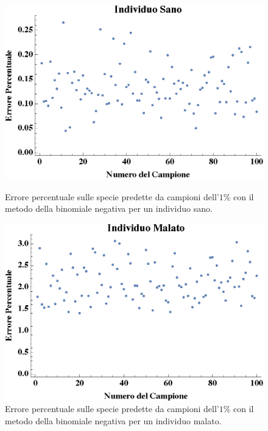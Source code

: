\begin{figure}[h]
  \centering
  \begin{minipage}[b]{0.4\textwidth}
    \includegraphics[width=\textwidth]{Figure/erroriHtets.eps}
    \caption{Errore percentuale sulle specie predette da campioni dell'$1 \% $  con il metodo della binomiale negativa per un individuo sano.}
    \label{fig:erroriH}
  \end{minipage}
  \hfill
  \begin{minipage}[b]{0.4\textwidth}
    \includegraphics[width=\textwidth]{Figure/erroriCtest.eps}
    \caption{Errore percentuale sulle specie predette da campioni dell'$1 \% $ con il metodo della binomiale negativa per un individuo malato.}
    \label{fig:erroriC}
  \end{minipage}
\end{figure}

